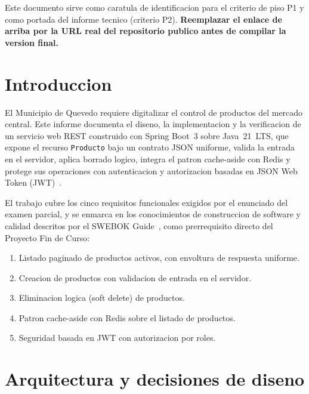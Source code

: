 \documentclass[11pt,a4paper]{article}
\begin{document}
\begin{titlepage}
    \vfill
    {\small Este documento sirve como caratula de identificacion para el
    criterio de piso P1 y como portada del informe tecnico (criterio P2).
    \textbf{Reemplazar el enlace de arriba por la URL real del repositorio
    publico antes de compilar la version final.}\par}

\end{titlepage}

\tableofcontents
\newpage

\section{Introduccion}

El Municipio de Quevedo requiere digitalizar el control de productos del
mercado central. Este informe documenta el diseno, la implementacion y la
verificacion de un servicio web REST construido con Spring Boot~3 sobre
Java~21~LTS, que expone el recurso \texttt{Producto} bajo un contrato JSON
uniforme, valida la entrada en el servidor, aplica borrado logico, integra
el patron cache-aside con Redis y protege sus operaciones con autenticacion
y autorizacion basadas en JSON Web Token (JWT)~\cite{rfc7519}.

El trabajo cubre los cinco requisitos funcionales exigidos por el
enunciado del examen parcial, y se enmarca en los conocimientos de
construccion de software y calidad descritos por el SWEBOK
Guide~\cite{swebok2024}, como prerrequisito directo del Proyecto Fin de
Curso:

\begin{enumerate}[label=R\arabic*.]
    \item Listado paginado de productos activos, con envoltura de respuesta uniforme.
    \item Creacion de productos con validacion de entrada en el servidor.
    \item Eliminacion logica (soft delete) de productos.
    \item Patron cache-aside con Redis sobre el listado de productos.
    \item Seguridad basada en JWT con autorizacion por roles.
\end{enumerate}

\section{Arquitectura y decisiones de diseno}
\end{document}
